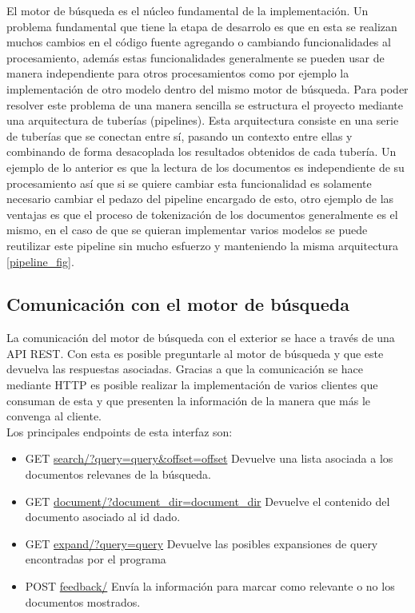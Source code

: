 \documentclass[runningheads]{llncs}
\begin{document}
El motor de búsqueda es el núcleo fundamental de la implementación. Un problema fundamental que
tiene la etapa de desarrolo es que en esta se realizan muchos cambios en el código fuente agregando
o cambiando funcionalidades al procesamiento, además estas funcionalidades generalmente se pueden usar
de manera independiente para otros procesamientos como por ejemplo la implementación de otro modelo
dentro del mismo motor de búsqueda. Para poder resolver este problema de una manera sencilla se estructura
el proyecto mediante una arquitectura de tuberías (pipelines). Esta arquitectura consiste en una serie
de tuberías que se conectan entre sí, pasando un contexto entre ellas y combinando de forma desacoplada
los resultados obtenidos de cada tubería. Un ejemplo de lo anterior es que la lectura de los documentos
es independiente de su procesamiento así que si se quiere cambiar esta funcionalidad es solamente necesario
cambiar el pedazo del pipeline encargado de esto, otro ejemplo de las ventajas es que el proceso de
tokenización de los documentos generalmente es el mismo, en el caso de que se quieran implementar varios
modelos se puede reutilizar este pipeline sin mucho esfuerzo y manteniendo la misma arquitectura \ref{pipeline_fig}.

\subsection{Comunicación con el motor de búsqueda}

La comunicación del motor de búsqueda con el exterior se hace a través de una API REST. Con esta
es posible preguntarle al motor de búsqueda y que este devuelva las respuestas asociadas. Gracias
a que la comunicación se hace mediante HTTP es posible realizar la implementación de varios clientes
que consuman de esta y que presenten la información de la manera que más le convenga al cliente.\\

Los principales endpoints de esta interfaz son:

\begin{itemize}
    \item GET \url{search/?query=query\&offset=offset} Devuelve una lista asociada a los
documentos relevanes de la búsqueda.
    \item GET \url{document/?document\_dir=document\_dir} Devuelve el contenido del documento asociado
al id dado.
	\item GET \url{expand/?query=query} Devuelve las posibles expansiones de query encontradas por el programa
	\item POST \url{feedback/} Envía la información para marcar como relevante o no los documentos mostrados.
\end{itemize}
\end{document}
